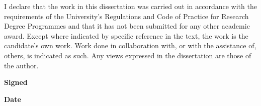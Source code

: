 \begin{declarationlong}



\noindent I declare that the work in this dissertation was carried out in accordance with the requirements of the University's Regulations and Code of Practice for Research Degree Programmes and that it has not been submitted for any other academic award. Except where indicated by specific reference in the text, the work is the candidate's own work. Work done in collaboration with, or with the assistance of, others, is indicated as such. Any views expressed in the dissertation are those of the author.

\vspace{25 mm}
\textbf{\large{Signed}}
\vspace{15 mm}

\textbf{\large{Date}}









\end{declarationlong}
\mbox{}
\thispagestyle{empty}
